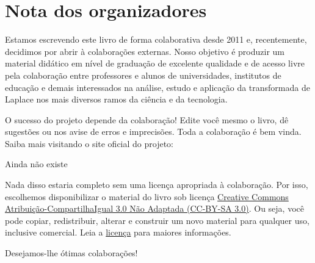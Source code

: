 
\chapter*{Nota dos organizadores}

Estamos escrevendo este livro de forma colaborativa desde 2011 e, recentemente, decidimos por abrir à colaborações externas. Nosso objetivo é produzir um material didático em nível de graduação de excelente qualidade e de acesso livre pela colaboração entre professores e alunos de universidades, institutos de educação e demais interessados na análise, estudo e aplicação da transformada de Laplace nos mais diversos ramos da ciência e da tecnologia.

O sucesso do projeto depende da colaboração! Edite você mesmo o livro, dê sugestões ou nos avise de erros e imprecisões. Toda a colaboração é bem vinda. Saiba mais visitando o site oficial do projeto:
\begin{center}
  Ainda não existe
\end{center}


Nada disso estaria completo sem uma licença apropriada à colaboração. Por isso, escolhemos disponibilizar o material do livro sob licença \href{https://creativecommons.org/licenses/by-sa/3.0/}{Creative Commons Atribuição-CompartilhaIgual 3.0 Não Adaptada (CC-BY-SA 3.0)}. Ou seja, você pode copiar, redistribuir, alterar e construir um novo material para qualquer uso, inclusive comercial. Leia a \href{https://creativecommons.org/licenses/by-sa/3.0/}{licença} para maiores informações.

\vspace{0.5cm}

Desejamos-lhe ótimas colaborações!

